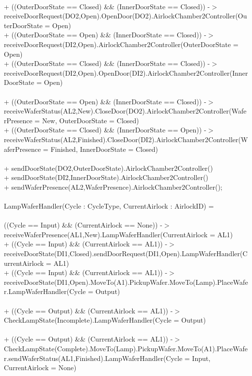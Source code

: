 \documentclass[a4paper,12pt]{article}
\begin{document}
\\+ ((OuterDoorState == Closed) \&\& (InnerDoorState == Closed)) -$>$ receiveDoorRequest(DO2,Open).OpenDoor(DO2).AirlockChamber2Controller(OuterDoorState = Open)
\\+ ((OuterDoorState == Open) \&\& (InnerDoorState == Closed)) -$>$ receiveDoorRequest(DI2,Open).AirlockChamber2Controller(OuterDoorState = Open)
\\+ ((OuterDoorState == Closed) \&\& (InnerDoorState == Closed)) -$>$ receiveDoorRequest(DI2,Open).OpenDoor(DI2).AirlockChamber2Controller(InnerDoorState = Open)
\\
\\+ ((OuterDoorState == Open) \&\& (InnerDoorState == Closed)) -$>$ receiveWaferStatus(AL2,New).CloseDoor(DO2).AirlockChamber2Controller(WaferPresence = New, OuterDoorState = Closed)
\\+ ((OuterDoorState == Closed) \&\& (InnerDoorState == Open)) -$>$ receiveWaferStatus(AL2,Finished).CloseDoor(DI2).AirlockChamber2Controller(WaferPresence = Finished, InnerDoorState = Closed)
\\
\\+ sendDoorState(DO2,OuterDoorState).AirlockChamber2Controller()
\\+ sendDoorState(DI2,InnerDoorState).AirlockChamber2Controller()
\\+ sendWaferPresence(AL2,WaferPresence).AirlockChamber2Controller();
\\
\\LampWaferHandler(Cycle : CycleType, CurrentAirlock : AirlockID) = 
\\
\\((Cycle == Input) \&\& (CurrentAirlock == None)) -$>$ receiveWaferPresence(AL1,New).LampWaferHandler(CurrentAirlock = AL1)
\\+ ((Cycle == Input) \&\& (CurrentAirlock == AL1)) -$>$ receiveDoorState(DI1,Closed).sendDoorRequest(DI1,Open).LampWaferHandler(CurrentAirlock = AL1)
\\+ ((Cycle == Input) \&\& (CurrentAirlock == AL1)) -$>$ receiveDoorState(DI1,Open).MoveTo(A1).PickupWafer.MoveTo(Lamp).PlaceWafer.LampWaferHandler(Cycle = Output)
\\
\\+ ((Cycle == Output) \&\& (CurrentAirlock == AL1)) -$>$ CheckLampState(Incomplete).LampWaferHandler(Cycle = Output)
\\
\\+ ((Cycle == Output) \&\& (CurrentAirlock == AL1)) -$>$ CheckLampState(Complete).MoveTo(Lamp).PickupWafer.MoveTo(A1).PlaceWafer.sendWaferStatus(AL1,Finished).LampWaferHandler(Cycle = Input, CurrentAirlock = None)
\end{document}
